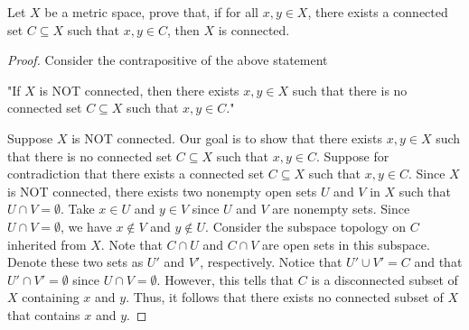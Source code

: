 \documentclass[a4paper]{article}
\begin{document}
\begin{problem}
    Let \( X  \) be a metric space, prove that, if for all \( x,y \in X  \), there exists a connected set \( C \subseteq X   \) such that \( x,y \in C  \), then \( X  \) is connected.
\end{problem}
\begin{proof}
Consider the contrapositive of the above statement
\begin{center}
    "If \( X  \) is NOT connected, then there exists \( x,y \in X  \) such that there is no connected set \( C \subseteq X   \) such that \( x,y \in C  \)."
\end{center}
Suppose \( X  \) is NOT connected. Our goal is to show that there exists \( x,y \in X  \) such that there is no connected set \( C \subseteq X   \) such that \( x,y \in C  \). Suppose for contradiction that there exists a connected set \( C \subseteq X  \) such that \( x,y \in C  \). Since \( X  \) is NOT connected, there exists two nonempty open sets \( U \) and \( V  \) in \( X  \) such that \( U \cap V = \emptyset \). Take \( x \in U  \) and \( y \in V  \) since \( U \) and \( V  \) are nonempty sets. Since \( U \cap V = \emptyset \), we have \( x \notin V  \) and \( y \notin U  \). Consider the subspace topology on \( C  \) inherited from \( X  \). Note that \( C \cap U  \) and \( C \cap V \) are open sets in this subspace. Denote these two sets as \( U' \) and \( V' \), respectively. Notice that \( U' \cup V' = C  \) and that \( U' \cap V' = \emptyset \) since \( U \cap V = \emptyset \). However, this tells that \( C  \) is a disconnected subset of \( X  \) containing \( x  \) and \( y  \). Thus, it follows that there exists no connected subset of \( X  \) that contains \( x  \) and \( y  \).
\end{proof}
\end{document}
